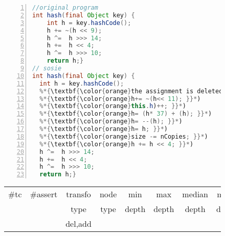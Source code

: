 \begin{figure}[ht]
\begin{lstlisting}[caption={\texttt{hash} in commons.collection},label={lst:coll-hash},language=java,numbers=left]
//original program
int hash(final Object key) {
    int h = key.hashCode();
    h += ~(h << 9); 
    h ^=  h >>> 14;
    h +=  h << 4;
    h ^=  h >>> 10;
    return h;}
// sosie  
int hash(final Object key) {
  int h = key.hashCode();
  %*{\textbf{\color{orange}the assignment is deleted or the following  statements are added}}*)
  %*{\textbf{\color{orange}h+= ~(h<< 11); }}*)
  %*{\textbf{\color{orange}this.h)++; }}*)
  %*{\textbf{\color{orange}h= (h* 37) + (h); }}*)
  %*{\textbf{\color{orange}h= --(h); }}*)
  %*{\textbf{\color{orange}h= h; }}*)
  %*{\textbf{\color{orange}size -= nCopies; }}*)
  %*{\textbf{\color{orange}h += h << 4; }}*)
  h ^=  h >>> 14;
  h +=  h << 4;
  h ^=  h >>> 10;
  return h;}
\end{lstlisting}
\tabcolsep=0.11cm
\begin{tabular}{>{\small}c>{\small}c>{\small}c>{\small}c>{\small}c>{\small}c>{\small}c>{\small}c}
\hline
\rowcolor{lightgray} \#tc & \#assert & transfo & node & min & max & median & mean   \\
\rowcolor{lightgray}  & & type & type & depth  & depth & depth & depth  \\ 
\hline
 &  & del,add &  &  &  &  & \\
\hline
\end{tabular}
\end{figure}

